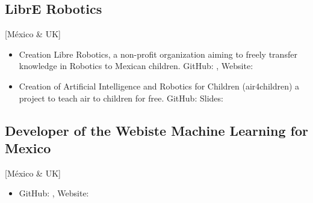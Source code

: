 \documentclass{mycv}
\begin{document}
\subsection{LibrE Robotics}[M\'exico \& UK]
\begin{itemize}

\item Creation Libre Robotics, a non-profit organization aiming to freely transfer knowledge in Robotics to Mexican children. GitHub: \href{https://github.com/librerobotics}{\faGithubAlt}, Website: \href{https://sites.google.com/site/LibreRobotics/}{\faExternalLink}  

\item Creation of Artificial Intelligence and Robotics for Children (air4children) a project to teach
air to children for free. GitHub: \href{https://github.com/librerobotics/air4children}{\faGithubAlt} Slides: \href{https://github.com/librerobotics/air4children/blob/master/docs/slides/presentation.air4children.pdf}{\faFilePdfO}  
\end{itemize}



\subsection{Developer of the Webiste Machine Learning for Mexico}[M\'exico \& UK]
\begin{itemize}
\item GitHub: \href{https://github.com/ML4MX}{\faGithubAlt}, Website: \href{https://ml4mx.github.io/website/}{\faExternalLink} 
\end{itemize}
\end{document}
